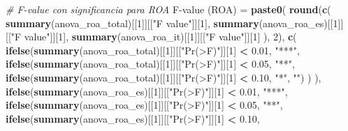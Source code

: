 \documentclass[
]{article}
\newenvironment{Shaded}{\begin{snugshade}}{\end{snugshade}}
\newcommand{\AttributeTok}[1]{\textcolor[rgb]{0.13,0.29,0.53}{#1}}
\newcommand{\CommentTok}[1]{\textcolor[rgb]{0.56,0.35,0.01}{\textit{#1}}}
\newcommand{\DecValTok}[1]{\textcolor[rgb]{0.00,0.00,0.81}{#1}}
\newcommand{\FloatTok}[1]{\textcolor[rgb]{0.00,0.00,0.81}{#1}}
\newcommand{\FunctionTok}[1]{\textcolor[rgb]{0.13,0.29,0.53}{\textbf{#1}}}
\newcommand{\NormalTok}[1]{#1}
\newcommand{\OtherTok}[1]{\textcolor[rgb]{0.56,0.35,0.01}{#1}}
\newcommand{\SpecialCharTok}[1]{\textcolor[rgb]{0.81,0.36,0.00}{\textbf{#1}}}
\newcommand{\StringTok}[1]{\textcolor[rgb]{0.31,0.60,0.02}{#1}}
\begin{document}
\begin{Shaded}
\begin{Highlighting}[]
  \CommentTok{\# F{-}value con significancia para ROA}
  \StringTok{\textasciigrave{}}\AttributeTok{F{-}value (ROA)}\StringTok{\textasciigrave{}} \OtherTok{=} \FunctionTok{paste0}\NormalTok{(}
    \FunctionTok{round}\NormalTok{(}\FunctionTok{c}\NormalTok{(}
      \FunctionTok{summary}\NormalTok{(anova\_roa\_total)[[}\DecValTok{1}\NormalTok{]][[}\StringTok{"F value"}\NormalTok{]][}\DecValTok{1}\NormalTok{],}
      \FunctionTok{summary}\NormalTok{(anova\_roa\_es)[[}\DecValTok{1}\NormalTok{]][[}\StringTok{"F value"}\NormalTok{]][}\DecValTok{1}\NormalTok{],}
      \FunctionTok{summary}\NormalTok{(anova\_roa\_it)[[}\DecValTok{1}\NormalTok{]][[}\StringTok{"F value"}\NormalTok{]][}\DecValTok{1}\NormalTok{]}
\NormalTok{    ), }\DecValTok{2}\NormalTok{),}
    \FunctionTok{c}\NormalTok{(}
      \FunctionTok{ifelse}\NormalTok{(}\FunctionTok{summary}\NormalTok{(anova\_roa\_total)[[}\DecValTok{1}\NormalTok{]][[}\StringTok{"Pr(\textgreater{}F)"}\NormalTok{]][}\DecValTok{1}\NormalTok{] }\SpecialCharTok{\textless{}} \FloatTok{0.01}\NormalTok{, }\StringTok{"***"}\NormalTok{,}
             \FunctionTok{ifelse}\NormalTok{(}\FunctionTok{summary}\NormalTok{(anova\_roa\_total)[[}\DecValTok{1}\NormalTok{]][[}\StringTok{"Pr(\textgreater{}F)"}\NormalTok{]][}\DecValTok{1}\NormalTok{] }\SpecialCharTok{\textless{}} \FloatTok{0.05}\NormalTok{, }\StringTok{"**"}\NormalTok{,}
                    \FunctionTok{ifelse}\NormalTok{(}\FunctionTok{summary}\NormalTok{(anova\_roa\_total)[[}\DecValTok{1}\NormalTok{]][[}\StringTok{"Pr(\textgreater{}F)"}\NormalTok{]][}\DecValTok{1}\NormalTok{] }\SpecialCharTok{\textless{}} \FloatTok{0.10}\NormalTok{, }
                           \StringTok{"*"}\NormalTok{, }\StringTok{""}\NormalTok{)}
\NormalTok{             )}
\NormalTok{      ),}
      \FunctionTok{ifelse}\NormalTok{(}\FunctionTok{summary}\NormalTok{(anova\_roa\_es)[[}\DecValTok{1}\NormalTok{]][[}\StringTok{"Pr(\textgreater{}F)"}\NormalTok{]][}\DecValTok{1}\NormalTok{] }\SpecialCharTok{\textless{}} \FloatTok{0.01}\NormalTok{, }\StringTok{"***"}\NormalTok{,}
             \FunctionTok{ifelse}\NormalTok{(}\FunctionTok{summary}\NormalTok{(anova\_roa\_es)[[}\DecValTok{1}\NormalTok{]][[}\StringTok{"Pr(\textgreater{}F)"}\NormalTok{]][}\DecValTok{1}\NormalTok{] }\SpecialCharTok{\textless{}} \FloatTok{0.05}\NormalTok{, }\StringTok{"**"}\NormalTok{,}
                    \FunctionTok{ifelse}\NormalTok{(}\FunctionTok{summary}\NormalTok{(anova\_roa\_es)[[}\DecValTok{1}\NormalTok{]][[}\StringTok{"Pr(\textgreater{}F)"}\NormalTok{]][}\DecValTok{1}\NormalTok{] }\SpecialCharTok{\textless{}} \FloatTok{0.10}\NormalTok{,}

\end{Highlighting}
\end{Shaded}
\end{document}
